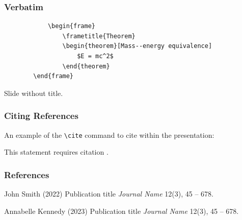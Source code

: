 \documentclass[
	11pt, %
]{beamer}
\begin{document}

\begin{frame}[fragile] %
    \frametitle{Verbatim}

    \begin{example}
        \begin{verbatim}
			\begin{frame}
				\frametitle{Theorem}
				\begin{theorem}[Mass--energy equivalence]
					$E = mc^2$
				\end{theorem}
		\end{frame}\end{verbatim} %
    \end{example}
\end{frame}


\begin{frame}
    Slide without title.
\end{frame}



\begin{frame}
    \frametitle{Citing References}

    An example of the \texttt{\textbackslash cite} command to cite within the presentation:

    \bigskip %

    This statement requires citation \cite{p1,p2}.
\end{frame}


\begin{frame} %
    \frametitle{References}

    \begin{thebibliography}{99} %
        \footnotesize %

        John Smith (2022)
        \newblock Publication title
        \newblock \emph{Journal Name} 12(3), 45 -- 678.

        Annabelle Kennedy (2023)
        \newblock Publication title
        \newblock \emph{Journal Name} 12(3), 45 -- 678.
    \end{thebibliography}
\end{frame}
\end{document}
